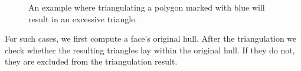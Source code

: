 \begin{figure}[H]
	\caption{An example where triangulating a polygon marked with blue will result in an excessive triangle.}
	\centering
	\qquad\qquad\qquad
	\qquad
\end{figure}

For such cases, we first compute a face's original hull. After the triangulation we check whether the resulting triangles
lay within the original hull. If they do not, they are excluded from the triangulation result.


